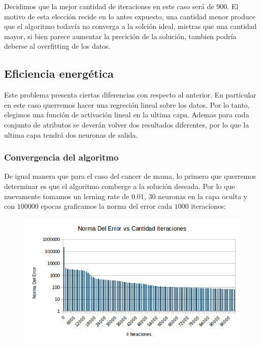 Decidimos que la mejor cantidad de iteraciones en este caso será de $900$. El motivo de esta elección recide en lo antes expuesto, una cantidad menor produce que el algoritmo todavía no converga a la solción ideal, mietras que una cantidad mayor, si bien parece aumentar la precición de la solución, tambien podría deberse al overfitting de los datos.

\subsection{Eficiencia energética} 


Este problema presenta ciertas diferencias con respecto al anterior. En particular en este caso querremos hacer una regreción lineal sobre los datos. Por lo tanto, elegimos una función de activación lineal en la ultima capa. Ademas para cada conjunto de atributos se deverán volver dos resultados diferentes, por lo que la ultima capa tendrá dos neuronas de salida.

\subsubsection{Convergencia del algoritmo}

De igual manera que para el caso del cancer de mama, lo primero que querremos determinar es que el algoritmo comberge a la solución deseada. Por lo que nuevamente tomamos un lerning rate de $0.01$, $30$ neuronas en la capa oculta y con $100000$ epocas graficamos la norma del error cada $1000$ iteraciones:


\begin{figure}[h!]
  \centering
    \includegraphics[scale=0.4]{ej2/convergencia.png}
\end{figure}

